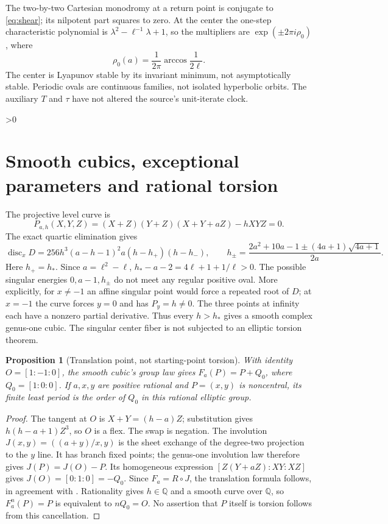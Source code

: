 \documentclass[10pt]{article}
\newcommand{\Q}{\mathbb Q}
\newtheorem{proposition}{Proposition}
\begin{document}
The two-by-two Cartesian monodromy at a return point is conjugate to
\eqref{eq:shear}; its nilpotent part squares to zero. At the center the
one-step characteristic polynomial is
$\lambda^2-\ell^{-1}\lambda+1$, so the multipliers are
$\exp(\pm2\pi i\rho_0)$, where
\begin{equation}\label{eq:center}
 \rho_0(a)=\frac{1}{2\pi}\arccos\frac{1}{2\ell}.
\end{equation}
The center is Lyapunov stable by its invariant minimum, not asymptotically
stable. Periodic ovals are continuous families, not isolated hyperbolic
orbits. The auxiliary $T$ and $\tau$ have not altered the source's
unit-iterate clock.

\ifnum\CRevisionRound>0
\section{Smooth cubics, exceptional parameters and rational torsion}
The projective level curve is
\begin{equation}\label{eq:cubic}
 P_{a,h}(X,Y,Z)=(X+Z)(Y+Z)(X+Y+aZ)-hXYZ=0.
\end{equation}
The exact quartic elimination gives
\begin{equation}\label{eq:discriminant}
 \operatorname{disc}_xD=256h^3(a-h-1)^2a(h-h_+)(h-h_-),\qquad
 h_\pm=\frac{2a^2+10a-1\pm(4a+1)\sqrt{4a+1}}{2a}.
\end{equation}
Here $h_+=h_*$. Since $a=\ell^2-\ell$,
$h_*-a-2=4\ell+1+1/\ell>0$. The possible singular energies
$0,a-1,h_\pm$ do not meet any regular positive oval. More explicitly,
for $x\ne-1$ an affine singular point would force a repeated root of $D$;
at $x=-1$ the curve forces $y=0$ and has $P_y=h\ne0$.
The three points at infinity each have a nonzero partial derivative.
Thus every $h>h_*$ gives a smooth complex genus-one cubic.
The singular center fiber is not subjected to an elliptic torsion theorem.

\begin{proposition}[Translation point, not starting-point torsion]
With identity $O=[1:-1:0]$, the smooth cubic's group law gives
$F_a(P)=P+Q_0$, where $Q_0=[1:0:0]$. If $a,x,y$ are positive rational
and $P=(x,y)$ is noncentral, its finite least period is the order of
$Q_0$ in this rational elliptic group.
\end{proposition}
\begin{proof}
The tangent at $O$ is $X+Y=(h-a)Z$; substitution gives
$h(h-a+1)Z^3$, so $O$ is a flex. The swap is negation. The involution
$J(x,y)=((a+y)/x,y)$ is the sheet exchange of the degree-two projection
to the $y$ line. It has branch fixed points; the genus-one involution
law therefore gives $J(P)=J(O)-P$. Its homogeneous expression
$[Z(Y+aZ):XY:XZ]$ gives $J(O)=[0:1:0]=-Q_0$.
Since $F_a=R\circ J$, the translation formula follows, in agreement
with \cite[Section 2.1]{gmx}. Rationality gives $h\in\Q$ and a smooth
curve over $\Q$, so $F_a^n(P)=P$ is equivalent to $nQ_0=O$.
No assertion that $P$ itself is torsion follows from this cancellation.
\end{proof}
\end{document}
